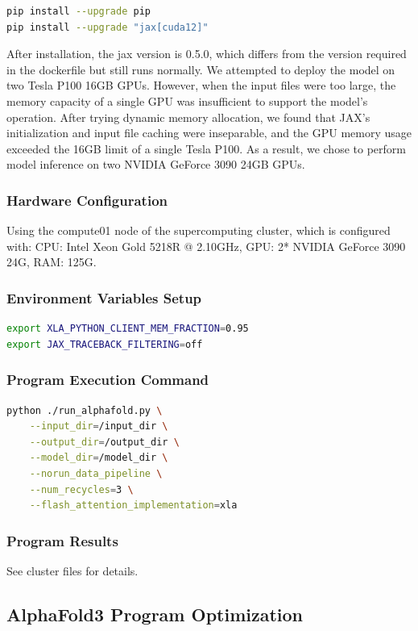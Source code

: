 \documentclass[a4paper,12pt]{article}
\begin{document}
\begin{lstlisting}[language=bash]
pip install --upgrade pip
pip install --upgrade "jax[cuda12]"
\end{lstlisting}

After installation, the jax version is 0.5.0, which differs from the version required in the dockerfile but still runs normally.
We attempted to deploy the model on two Tesla P100 16GB GPUs. However, when the input files were too large, the memory capacity of a single GPU was insufficient to support the model's operation. After trying dynamic memory allocation, we found that JAX's initialization and input file caching were inseparable, and the GPU memory usage exceeded the 16GB limit of a single Tesla P100. As a result, we chose to perform model inference on two NVIDIA GeForce 3090 24GB GPUs.
\subsubsection{Hardware Configuration}
Using the compute01 node of the supercomputing cluster, which is configured with: CPU: Intel Xeon Gold 5218R @ 2.10GHz, GPU: 2* NVIDIA GeForce 3090 24G, RAM: 125G.

\subsubsection{Environment Variables Setup}
\begin{lstlisting}[language=bash]
export XLA_PYTHON_CLIENT_MEM_FRACTION=0.95
export JAX_TRACEBACK_FILTERING=off
\end{lstlisting}

\subsubsection{Program Execution Command}
\begin{lstlisting}[language=bash]
python ./run_alphafold.py \
    --input_dir=/input_dir \
    --output_dir=/output_dir \
    --model_dir=/model_dir \
    --norun_data_pipeline \
    --num_recycles=3 \
    --flash_attention_implementation=xla
\end{lstlisting}

\subsubsection{Program Results}
See cluster files for details.

\subsection{AlphaFold3 Program Optimization}
\end{document}
